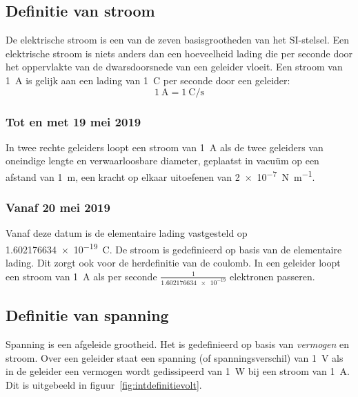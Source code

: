 




\subsection{Definitie van stroom}
De elektrische stroom is een van de zeven basisgrootheden van het SI-stelsel. Een elektrische stroom is niets anders dan een hoeveelheid lading die per seconde door het oppervlakte van de dwarsdoorsnede van een geleider vloeit. Een stroom van \SI{1}{\ampere} is gelijk aan een lading van \SI{1}{\coulomb} per seconde door een geleider:
%
\begin{equation}
\SI{1}{\ampere} = \SI[per-mode=fraction]{1}{\coulomb\per\second}
\end{equation} 

\subsubsection*{Tot en met 19 mei 2019}
In twee rechte geleiders loopt een stroom van \SI{1}{\ampere} als de twee geleiders van oneindige lengte en verwaarloosbare diameter, geplaatst in vacuüm op een afstand van \SI{1}{\meter}, een kracht op elkaar uitoefenen van \SI[per-mode=symbol]{2e-7}{\newton\per\meter}.

\subsubsection*{Vanaf 20 mei 2019}
Vanaf deze datum is de elementaire lading vastgesteld op \SI{1.602176634e-19}{\coulomb}. De stroom is gedefinieerd op basis van de elementaire lading. Dit zorgt ook voor de herdefinitie van de coulomb. In een geleider loopt een stroom van \SI{1}{\ampere} als per seconde $\frac{1}{\num{1.602176634e-19}}$ elektronen passeren.

\subsection{Definitie van spanning}
Spanning is een afgeleide grootheid. Het is gedefinieerd op basis van \textsl{vermogen} en stroom. Over een geleider staat een spanning (of spanningsverschil) van \SI{1}{\volt} als in de geleider een vermogen wordt gedissipeerd van \SI{1}{\watt} bij een stroom van \SI{1}{\ampere}. Dit is uitgebeeld in figuur~\ref{fig:intdefinitievolt}.

